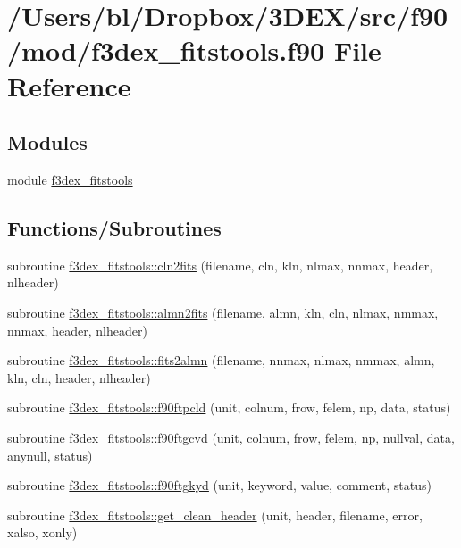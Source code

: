 \hypertarget{f3dex__fitstools_8f90}{
\section{/Users/bl/Dropbox/3DEX/src/f90/mod/f3dex\_\-fitstools.f90 File Reference}
\label{f3dex__fitstools_8f90}
}
\subsection*{Modules}
\begin{DoxyCompactItemize}
\item 
module \hyperlink{namespacef3dex__fitstools}{f3dex\_\-fitstools}
\end{DoxyCompactItemize}
\subsection*{Functions/Subroutines}
\begin{DoxyCompactItemize}
\item 
subroutine \hyperlink{namespacef3dex__fitstools_aab1f14e65c2837494cb15ff4fd54b372}{f3dex\_\-fitstools::cln2fits} (filename, cln, kln, nlmax, nnmax, header, nlheader)
\item 
subroutine \hyperlink{namespacef3dex__fitstools_a3bb8fd149a1c137d3176d484e28bbef0}{f3dex\_\-fitstools::almn2fits} (filename, almn, kln, cln, nlmax, nmmax, nnmax, header, nlheader)
\item 
subroutine \hyperlink{namespacef3dex__fitstools_a106cd0d1eb3bcd38d2c43228f499f57b}{f3dex\_\-fitstools::fits2almn} (filename, nnmax, nlmax, nmmax, almn, kln, cln, header, nlheader)
\item 
subroutine \hyperlink{namespacef3dex__fitstools_a83e1158f828e86e43f1dc68bc0e7c59b}{f3dex\_\-fitstools::f90ftpcld} (unit, colnum, frow, felem, np, data, status)
\item 
subroutine \hyperlink{namespacef3dex__fitstools_ada7b447f4ace46eabf663495c3a8c8c2}{f3dex\_\-fitstools::f90ftgcvd} (unit, colnum, frow, felem, np, nullval, data, anynull, status)
\item 
subroutine \hyperlink{namespacef3dex__fitstools_ab7baecf48bb7833c32bc7be570f947c1}{f3dex\_\-fitstools::f90ftgkyd} (unit, keyword, value, comment, status)
\item 
subroutine \hyperlink{namespacef3dex__fitstools_a0d143b6a055e5c50c19b86e75d94c663}{f3dex\_\-fitstools::get\_\-clean\_\-header} (unit, header, filename, error, xalso, xonly)
\end{DoxyCompactItemize}
